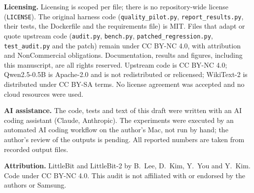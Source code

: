 \documentclass[11pt]{article}
\begin{document}
\noindent\textbf{Licensing.}
Licensing is scoped per file; there is no repository-wide license (\texttt{LICENSE}). The original
harness code (\texttt{quality\_pilot.py}, \texttt{report\_results.py}, their tests, the Dockerfile
and the requirements file) is MIT. Files that adapt or quote upstream code (\texttt{audit.py},
\texttt{bench.py}, \texttt{patched\_regression.py}, \texttt{test\_audit.py} and the patch) remain
under CC BY-NC 4.0, with attribution and NonCommercial obligations. Documentation, results and
figures, including this manuscript, are all rights reserved. Upstream code is CC BY-NC 4.0;
Qwen2.5-0.5B is Apache-2.0 and is not redistributed or relicensed; WikiText-2 is distributed under
CC BY-SA terms. No license agreement was accepted and no cloud resources were used.

\noindent\textbf{AI assistance.}
The code, tests and text of this draft were written with an AI coding assistant (Claude,
Anthropic). The experiments were executed by an automated AI coding workflow on the author's Mac,
not run by hand; the author's review of the outputs is pending. All reported numbers are taken
from recorded output files.

\noindent\textbf{Attribution.}
LittleBit and LittleBit-2 by B.~Lee, D.~Kim, Y.~You and Y.~Kim. Code under CC BY-NC 4.0. This
audit is not affiliated with or endorsed by the authors or Samsung.
\par
\endgroup
\end{document}
